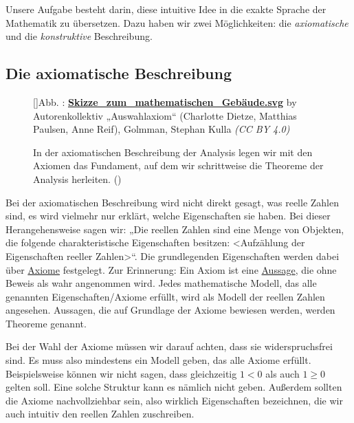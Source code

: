 \documentclass[fontsize=9pt,
               parskip=half-,
               DIV=14,
               listof=chapterentry,
               tocflat]{scrbook}
\newcounter{imagelabel}
\begin{document}
Unsere Aufgabe besteht darin, diese intuitive Idee in die exakte Sprache der Mathematik zu übersetzen. Dazu haben wir zwei Möglichkeiten: die \emph{axiomatische} und die \emph{konstruktive} Beschreibung.

\subsection{Die axiomatische Beschreibung}

\begin{figure}[h]
\vspace{\baselineskip}
[]{Abb. : \protect\href{https://commons.wikimedia.org/wiki/File:Skizze_zum_mathematischen_Gebäude.svg}{\textbf{Skizze\allowbreak\_zum\allowbreak\_mathematischen\allowbreak\_Gebäude.svg}} by Autorenkollektiv „Auswahlaxiom“ (Charlotte Dietze, Matthias Paulsen, Anne Reif), Golmman, Stephan Kulla \textit{(CC BY 4.0)}}\centering
{}
\caption*{In der axiomatischen Beschreibung der Analysis legen wir mit den Axiomen das Fundament, auf dem wir schrittweise die Theoreme der Analysis herleiten. ()}
\end{figure}
Bei der axiomatischen Beschreibung wird nicht direkt gesagt, was reelle Zahlen sind, es wird vielmehr nur erklärt, welche Eigenschaften sie haben. Bei dieser Herangehensweise sagen wir: „Die reellen Zahlen sind eine Menge von Objekten, die folgende charakteristische Eigenschaften besitzen: \textless{}Aufzählung der Eigenschaften reeller Zahlen\textgreater{}“. Die grundlegenden Eigenschaften werden dabei über \href{https://de.wikibooks.org/wiki/Mathe\_für\_Nicht-Freaks:\_Wörterbuch\#Anker:Axiom}
{Axiome} festgelegt. Zur Erinnerung: Ein Axiom ist eine \href{https://de.wikibooks.org/wiki/Mathe\_für\_Nicht-Freaks:\_Aussagenlogik\#Aussage}
{Aussage}, die ohne Beweis als wahr angenommen wird. Jedes mathematische Modell, das alle genannten Eigenschaften/Axiome erfüllt, wird als Modell der reellen Zahlen angesehen. Aussagen, die auf Grundlage der Axiome bewiesen werden, werden Theoreme genannt.

Bei der Wahl der Axiome müssen wir darauf achten, dass sie widerspruchsfrei sind. Es muss also mindestens ein Modell geben, das alle Axiome erfüllt. Beispielsweise können wir nicht sagen, dass gleichzeitig $1<0$ als auch $1\geq 0$ gelten soll. Eine solche Struktur kann es nämlich nicht geben. Außerdem sollten die Axiome nachvollziehbar sein, also wirklich Eigenschaften bezeichnen, die wir auch intuitiv den reellen Zahlen zuschreiben.
\end{document}

